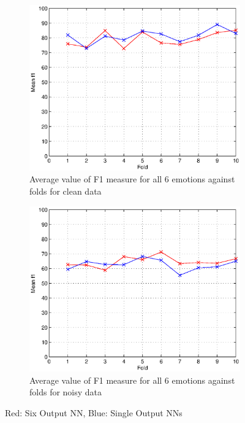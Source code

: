 \documentclass[10pt,a4paper]{article}
\begin{document}
\begin{figure}[!ht]
	\centering
	\begin{subfigure}[b]{0.7\textwidth}
		\includegraphics[width=\textwidth]{images/clean_fold_f1_plot.eps}
     	\caption{Average value of F1 measure for all 6 emotions against folds for clean data}
     	\label{fig:avgF1Clean}
    \end{subfigure}
	\begin{subfigure}[b]{0.7\textwidth}
		\includegraphics[width=\textwidth]{images/noisy_fold_f1_plot.eps}
     	\caption{Average value of F1 measure for all 6 emotions against folds for noisy data}
     	\label{fig:avgF1Noisy}
    \end{subfigure}
    \caption{Red: Six Output NN, Blue: Single Output NNs}
    \label{fig:avgF1}
\end{figure}
\end{document}
